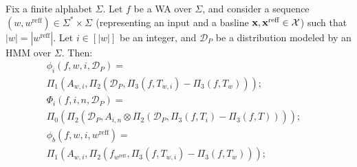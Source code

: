 \begin{unumberedlemma}
Fix a finite alphabet $\Sigma$. Let $f$ be a WA over $\Sigma$, and consider a sequence $(w, w^{\text{reff}}) \in \Sigma^{*} \times \Sigma^{}$ (representing an input and a basline $\textbf{x}, \textbf{x}^{\text{reff}} \in \mathcal{X}$) such that $|w| = |w^{\text{reff}}|$. Let $i \in [|w|]$ be an integer, and $\mathcal{D}_P$ be a distribution modeled by an HMM over $\Sigma$. Then:
         {\small 
            \begin{align*}
         \phi_i
         (f,w,i,\mathcal{D}_P) = \quad\quad\quad\quad\quad\quad\quad\quad\quad\quad\quad\quad\quad\quad\quad\quad \\ \Pi_{1} (A_{w,i}, \Pi_{2}(\mathcal{D}_P, \Pi_{3}(f,T_{w,i}) 
          - \Pi_{3}(f,T_{w}) ) ); \quad\quad \\
            \Phi_i(f,i,n,\mathcal{D}_P) = \quad\quad\quad\quad\quad\quad\quad\quad\quad\quad\quad\quad\quad\quad\quad\quad \\ 
            \Pi_{0} ( \Pi_{2}(\mathcal{D}_P, A_{i,n} \otimes \Pi_{2}(\mathcal{D}_P, 
             \Pi_{3}(f,T_{i}) - \Pi_{3}(f,T)))); \quad\\
            \phi_b(f,w,i,w^{\text{reff}}) = \quad\quad\quad\quad\quad\quad\quad\quad\quad\quad\quad\quad\quad\quad\quad\quad \\ \Pi_{1} (A_{w,i}, \Pi_{2}(f_{w^{\text{reff}}}, \Pi_{3}(f,T_{w,i}) 
          - \Pi_{3}(f,T_{w})));\quad \\

\end{align*}}
\end{unumberedlemma}
